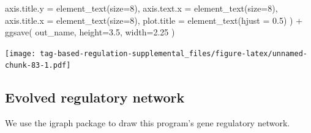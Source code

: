 \documentclass[
]{book}
\newenvironment{Shaded}{\begin{snugshade}}{\end{snugshade}}
\newcommand{\AttributeTok}[1]{\textcolor[rgb]{0.77,0.63,0.00}{#1}}
\newcommand{\DecValTok}[1]{\textcolor[rgb]{0.00,0.00,0.81}{#1}}
\newcommand{\FloatTok}[1]{\textcolor[rgb]{0.00,0.00,0.81}{#1}}
\newcommand{\FunctionTok}[1]{\textcolor[rgb]{0.00,0.00,0.00}{#1}}
\newcommand{\NormalTok}[1]{#1}
\newcommand{\SpecialCharTok}[1]{\textcolor[rgb]{0.00,0.00,0.00}{#1}}
\begin{document}
\begin{Shaded}
\begin{Highlighting}[]
    \AttributeTok{axis.title.y =} \FunctionTok{element\_text}\NormalTok{(}\AttributeTok{size=}\DecValTok{8}\NormalTok{),}
    \AttributeTok{axis.text.x =} \FunctionTok{element\_text}\NormalTok{(}\AttributeTok{size=}\DecValTok{8}\NormalTok{),}
    \AttributeTok{axis.title.x =} \FunctionTok{element\_text}\NormalTok{(}\AttributeTok{size=}\DecValTok{8}\NormalTok{),}
    \AttributeTok{plot.title =} \FunctionTok{element\_text}\NormalTok{(}\AttributeTok{hjust =} \FloatTok{0.5}\NormalTok{)}
\NormalTok{  ) }\SpecialCharTok{+}
  \FunctionTok{ggsave}\NormalTok{(}
\NormalTok{    out\_name,}
    \AttributeTok{height=}\FloatTok{3.5}\NormalTok{,}
    \AttributeTok{width=}\FloatTok{2.25}
\NormalTok{  )}
\end{Highlighting}
\end{Shaded}

\texttt{[image: tag-based-regulation-supplemental\_files/figure-latex/unnamed-chunk-83-1.pdf]}

\hypertarget{evolved-regulatory-network-2}{%
\subsection{Evolved regulatory network}\label{evolved-regulatory-network-2}}

We use the igraph package to draw this program's gene regulatory network.
\end{document}
